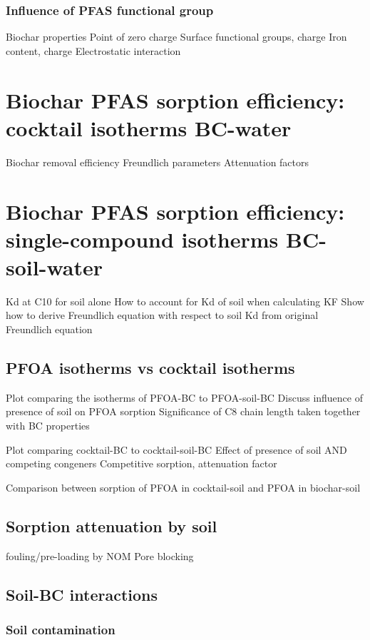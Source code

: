 \subsubsection{Influence of PFAS functional group}
Biochar properties
    Point of zero charge
    Surface functional groups, charge
    Iron content, charge
    Electrostatic interaction

\section{Biochar PFAS sorption efficiency: cocktail isotherms BC-water}
Biochar removal efficiency 
Freundlich parameters
Attenuation factors

\section{Biochar PFAS sorption efficiency: single-compound isotherms BC-soil-water}
Kd at C10 for soil alone
How to account for Kd of soil when calculating KF 
    Show how to derive Freundlich equation with respect to soil Kd from original Freundlich equation
    
\subsection{PFOA isotherms vs cocktail isotherms}
Plot comparing the isotherms of PFOA-BC to PFOA-soil-BC
Discuss influence of presence of soil on PFOA sorption
Significance of C8 chain length taken together with BC properties 

Plot comparing cocktail-BC to cocktail-soil-BC
Effect of presence of soil AND competing congeners
Competitive sorption, attenuation factor

Comparison between sorption of PFOA in cocktail-soil and PFOA in biochar-soil

\subsection{Sorption attenuation by soil}
fouling/pre-loading by NOM
Pore blocking

\subsection{Soil-BC interactions}

\subsubsection{Soil contamination}

